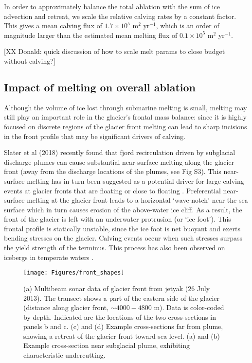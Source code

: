 \documentclass[10pt,letterpaper]{article}
\begin{document}
In order to approximately balance the total ablation with the sum of ice advection and retreat, we scale the relative calving rates by a constant factor. This gives a mean calving flux of $1.7 \times 10^5$ m$^2$ yr$^{-1}$, which is an order of magnitude larger than the estimated mean melting flux of $0.1 \times 10^5$ m$^2$ yr$^{-1}$. 

[XX Donald: quick discussion of how to scale melt params to close budget without calving?]

\subsection{Impact of melting on overall ablation}

Although the volume of ice lost through submarine melting is small, melting may still play an important role in the glacier's frontal mass balance: since it is highly focused on discrete regions of the glacier front melting can lead to sharp incisions in the front profile that may be significant drivers of calving.

Slater et al (2018) recently found that fjord recirculation driven by subglacial discharge plumes can cause substantial near-surface melting along the glacier front (away from the discharge locations of the plumes, see Fig S3). This near-surface melting has in turn been suggested as a potential driver for large calving events at glacier fronts that are floating or close to floating \cite{Wagner:2016hj}. Preferential near-surface melting at the glacier front leads to a horizontal `wave-notch' near the sea surface which in turn causes erosion of the above-water ice cliff. As a result, the front of the glacier is left with an underwater protrusion (or `ice foot'). This frontal profile is statically unstable, since the ice foot is net buoyant and exerts bending stresses on the glacier. Calving events occur when such stresses surpass the yield strength of the terminus. This process has also been observed on icebergs in temperate waters \cite{Scambos:2005un,Wagner:2014uz}. 

  \begin{figure*}[t]
 \begin{center}
  \texttt{[image: Figures/front\_shapes]}
  \caption{(a) Multibeam sonar data of glacier front from jetyak (26 July 2013). The transect shows a part of the eastern side of the glacier (distance along glacier front, $\sim 4000 - 4800$ m). Data is color-coded by depth. Indicated are the locations of the two cross-sections in panels b and c. (c) and (d) Example cross-sections far from plume, showing a retreat of the glacier front toward sea level. (a) and (b) Example cross-section near subglacial plume, exhibiting characteristic undercutting.}
  \label{fig:fronts}
  \end{center}
\end{figure*}
\end{document}
